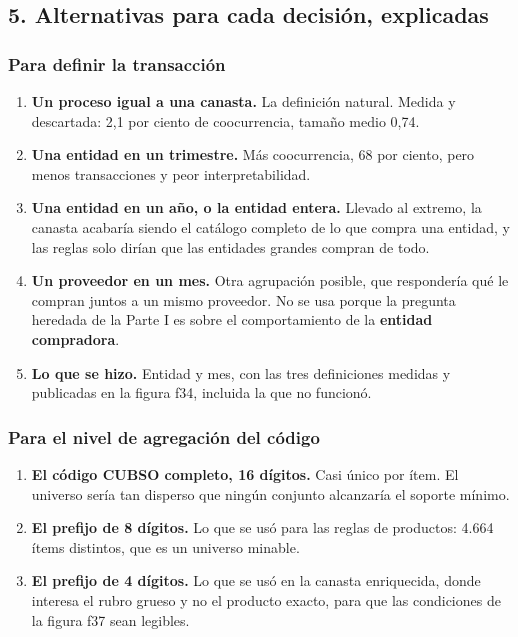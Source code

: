 \documentclass[11pt]{article}
\begin{document}
\subsection*{5. Alternativas para cada decisión, explicadas}
\subsubsection*{Para definir la transacción}
\begin{enumerate}
  \item \textbf{Un proceso igual a una canasta.} La definición natural. Medida y descartada: 2,1 por ciento de coocurrencia, tamaño medio 0,74.
  \item \textbf{Una entidad en un trimestre.} Más coocurrencia, 68 por ciento, pero menos transacciones y peor interpretabilidad.
  \item \textbf{Una entidad en un año, o la entidad entera.} Llevado al extremo, la canasta acabaría siendo el catálogo completo de lo que compra una entidad, y las reglas solo dirían que las entidades grandes compran de todo.
  \item \textbf{Un proveedor en un mes.} Otra agrupación posible, que respondería qué le compran juntos a un mismo proveedor. No se usa porque la pregunta heredada de la Parte I es sobre el comportamiento de la \textbf{entidad compradora}.
  \item \textbf{Lo que se hizo.} Entidad y mes, con las tres definiciones medidas y publicadas en la figura f34, incluida la que no funcionó.
\end{enumerate}
\subsubsection*{Para el nivel de agregación del código}
\begin{enumerate}
  \item \textbf{El código CUBSO completo, 16 dígitos.} Casi único por ítem. El universo sería tan disperso que ningún conjunto alcanzaría el soporte mínimo.
  \item \textbf{El prefijo de 8 dígitos.} Lo que se usó para las reglas de productos: 4.664 ítems distintos, que es un universo minable.
  \item \textbf{El prefijo de 4 dígitos.} Lo que se usó en la canasta enriquecida, donde interesa el rubro grueso y no el producto exacto, para que las condiciones de la figura f37 sean legibles.
\end{enumerate}
\end{document}
